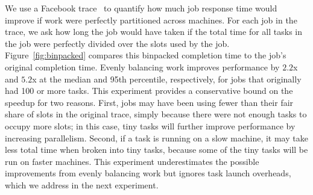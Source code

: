 We use a Facebook trace~\cite{chen2012interactive} to quantify how much job response time would
improve if work were perfectly partitioned across machines.
For each job in the trace, we ask how long the job would have taken if the
total time for all tasks in the job were perfectly divided over the slots
used by the job.
Figure~\ref{fig:binpacked} compares this binpacked completion time to the
job's original completion time. Evenly balancing work improves performance by
$2.2$x and $5.2$x at the median and 95th percentile, respectively, for
jobs that originally had 100 or more tasks.
This experiment provides a conservative bound on the speedup for two reasons. First, jobs
may have been using fewer than their fair share of slots in the original trace,
simply because there were not enough tasks to occupy more slots; in this case,
tiny tasks will further improve performance by increasing parallelism. Second,
if a task is running on a slow machine, it may take less total time when
broken into tiny tasks, because some of the tiny tasks will be run on faster
machines.
This experiment underestimates the possible improvements from
evenly balancing work but ignores task launch overheads, which
we address in the next experiment.


